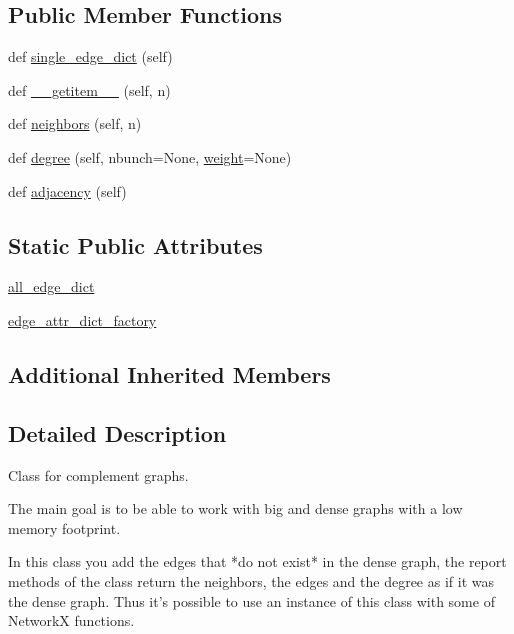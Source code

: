 \subsection*{Public Member Functions}
\begin{DoxyCompactItemize}
\item 
def \hyperlink{classplot__antigraph_1_1AntiGraph_af471611131c7560d9e8e64b23b19a525}{single\+\_\+edge\+\_\+dict} (self)
\item 
def \hyperlink{classplot__antigraph_1_1AntiGraph_ae3cedb5952f6856869af554e7e81d49b}{\+\_\+\+\_\+getitem\+\_\+\+\_\+} (self, n)
\item 
def \hyperlink{classplot__antigraph_1_1AntiGraph_a814d549889d36f333211967793b88229}{neighbors} (self, n)
\item 
def \hyperlink{classplot__antigraph_1_1AntiGraph_a90ae3cf25b4191c16636e611ecb6af42}{degree} (self, nbunch=None, \hyperlink{namespaceplot__antigraph_a3e303333b2262260b3826f0f339c5510}{weight}=None)
\item 
def \hyperlink{classplot__antigraph_1_1AntiGraph_aeabbfd57523a9e4087d660f9463038b3}{adjacency} (self)
\end{DoxyCompactItemize}
\subsection*{Static Public Attributes}
\begin{DoxyCompactItemize}
\item 
\hyperlink{classplot__antigraph_1_1AntiGraph_a9b4ccf94ba9b98726892b7ae3fb39962}{all\+\_\+edge\+\_\+dict}
\item 
\hyperlink{classplot__antigraph_1_1AntiGraph_ae7827dc88bfc6f1c4b3a27fc7918eb6a}{edge\+\_\+attr\+\_\+dict\+\_\+factory}
\end{DoxyCompactItemize}
\subsection*{Additional Inherited Members}


\subsection{Detailed Description}
\begin{DoxyVerb}Class for complement graphs.

The main goal is to be able to work with big and dense graphs with
a low memory footprint.

In this class you add the edges that *do not exist* in the dense graph,
the report methods of the class return the neighbors, the edges and
the degree as if it was the dense graph. Thus it's possible to use
an instance of this class with some of NetworkX functions.
\end{DoxyVerb}
 

